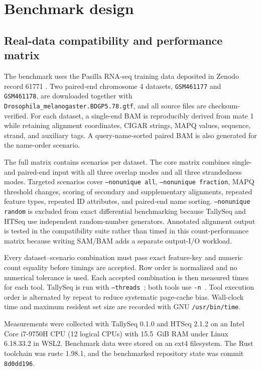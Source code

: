 \documentclass[11pt]{article}
\begin{document}
\section{Benchmark design}

\subsection{Real-data compatibility and performance matrix}

The benchmark uses the Pasilla RNA-seq training data deposited in Zenodo record 61771 \citep{Gruning2016}. Two paired-end chromosome 4 datasets, \texttt{GSM461177} and \texttt{GSM461178}, are downloaded together with \texttt{Drosophila\_melanogaster.BDGP5.78.gtf}, and all source files are checksum-verified. For each dataset, a single-end BAM is reproducibly derived from mate 1 while retaining alignment coordinates, CIGAR strings, MAPQ values, sequence, strand, and auxiliary tags. A query-name-sorted paired BAM is also generated for the name-order scenario.

The full matrix contains \BenchmarkScenarioCount{} scenarios per dataset. The core matrix combines single- and paired-end input with all three overlap modes and all three strandedness modes. Targeted scenarios cover \texttt{--nonunique all}, \texttt{--nonunique fraction}, MAPQ threshold changes, scoring of secondary and supplementary alignments, repeated feature types, repeated ID attributes, and paired-end name sorting. \texttt{--nonunique random} is excluded from exact differential benchmarking because TallySeq and HTSeq use independent random-number generators. Annotated alignment output is tested in the compatibility suite rather than timed in this count-performance matrix because writing SAM/BAM adds a separate output-I/O workload.

Every dataset--scenario combination must pass exact feature-key and numeric count equality before timings are accepted. Row order is normalized and no numerical tolerance is used. Each accepted combination is then measured \BenchmarkRepeats{} times for each tool. TallySeq is run with \texttt{--threads \BenchmarkTallyThreads}; both tools use \texttt{-n \BenchmarkNProcesses}. Tool execution order is alternated by repeat to reduce systematic page-cache bias. Wall-clock time and maximum resident set size are recorded with GNU \texttt{/usr/bin/time}.

Measurements were collected with TallySeq 0.1.0 and HTSeq 2.1.2 on an Intel Core i7-9750H CPU (12 logical CPUs) with 15.5~GiB RAM under Linux 6.18.33.2 in WSL2. Benchmark data were stored on an ext4 filesystem. The Rust toolchain was rustc 1.98.1, and the benchmarked repository state was commit \texttt{8d0dd196}.
\end{document}
